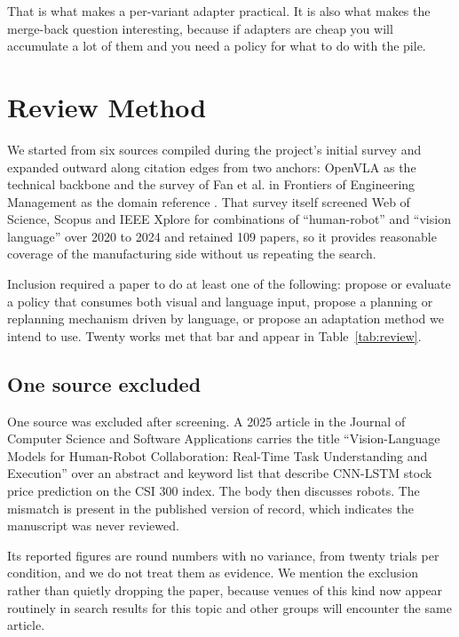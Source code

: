 \documentclass[conference]{IEEEtran}
\begin{document}
That is what makes a per-variant adapter practical. It is also what makes
the merge-back question interesting, because if adapters are cheap you
will accumulate a lot of them and you need a policy for what to do with
the pile.

\section{Review Method}
\label{sec:method}

We started from six sources compiled during the project's initial survey
and expanded outward along citation edges from two anchors: OpenVLA as
the technical backbone \cite{openvla} and the survey of Fan et al. in
Frontiers of Engineering Management as the domain reference
\cite{fansurvey}. That survey itself screened Web of Science, Scopus and
IEEE Xplore for combinations of ``human-robot'' and ``vision language''
over 2020 to 2024 and retained 109 papers, so it provides reasonable
coverage of the manufacturing side without us repeating the search.

Inclusion required a paper to do at least one of the following: propose
or evaluate a policy that consumes both visual and language input,
propose a planning or replanning mechanism driven by language, or propose
an adaptation method we intend to use. Twenty works met that bar and
appear in Table~\ref{tab:review}.

\subsection{One source excluded}

One source was excluded after screening. A 2025 article in the Journal of
Computer Science and Software Applications carries the title
``Vision-Language Models for Human-Robot Collaboration: Real-Time Task
Understanding and Execution'' over an abstract and keyword list that
describe CNN-LSTM stock price prediction on the CSI 300 index. The body
then discusses robots. The mismatch is present in the published version
of record, which indicates the manuscript was never reviewed.

Its reported figures are round numbers with no variance, from twenty
trials per condition, and we do not treat them as evidence. We mention
the exclusion rather than quietly dropping the paper, because venues of
this kind now appear routinely in search results for this topic and other
groups will encounter the same article.
\end{document}
